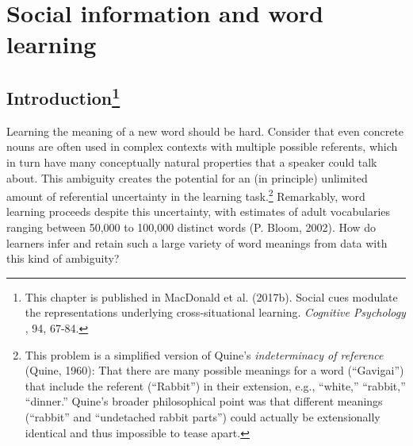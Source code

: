 \documentclass[oneside]{report}
\begin{document}
\chapter{Social information and word learning}\label{soc-xsit}

\section[Introduction]{\texorpdfstring{Introduction\footnote{This
  chapter is published in MacDonald et al. (2017b). Social cues modulate
  the representations underlying cross-situational learning.
  \emph{Cognitive Psychology }, 94, 67-84.}}{Introduction}}\label{introduction-3}

Learning the meaning of a new word should be hard. Consider that even
concrete nouns are often used in complex contexts with multiple possible
referents, which in turn have many conceptually natural properties that
a speaker could talk about. This ambiguity creates the potential for an
(in principle) unlimited amount of referential uncertainty in the
learning task.\footnote{This problem is a simplified version of Quine's
  \textit{indeterminacy of reference} (Quine, 1960): That there are many
  possible meanings for a word (``Gavigai'') that include the referent
  (``Rabbit'') in their extension, e.g., ``white,'' ``rabbit,''
  ``dinner.'' Quine's broader philosophical point was that different
  meanings (``rabbit'' and ``undetached rabbit parts'') could actually
  be extensionally identical and thus impossible to tease apart.}
Remarkably, word learning proceeds despite this uncertainty, with
estimates of adult vocabularies ranging between 50,000 to 100,000
distinct words (P. Bloom, 2002). How do learners infer and retain such a
large variety of word meanings from data with this kind of ambiguity?
\end{document}
